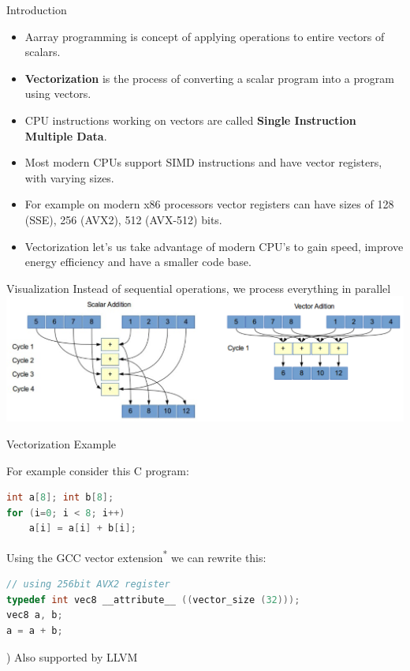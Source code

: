 \documentclass[]{beamer}
\begin{document}
\begin{frame}{Introduction}

\begin{itemize}
  \item Aarray programming is concept of applying operations to entire vectors of scalars.
  \item \textbf{Vectorization} is the process of converting a scalar program into a program using vectors.
  \item CPU instructions working on vectors are called \textbf{Single Instruction Multiple Data}.
  \item Most modern CPUs support SIMD instructions and have vector registers, with varying sizes.
  \item For example on modern x86 processors vector registers can have sizes of 128 (SSE), 256 (AVX2), 512 (AVX-512) bits.
  \item Vectorization let's us take advantage of modern CPU's to gain speed, 
        improve energy  efficiency and have a smaller code base.
\end{itemize}

\end{frame}


\begin{frame}{Visualization}
Instead of sequential operations, we process everything in parallel 
\includegraphics[width=\textwidth]{pictures/vectorization}
\end{frame}


\begin{frame}[fragile]{Vectorization Example}

For example consider this C program:
\begin{lstlisting}[language=C]
int a[8]; int b[8];
for (i=0; i < 8; i++)
    a[i] = a[i] + b[i];
\end{lstlisting}

Using the GCC vector extension\textsuperscript{*} we can rewrite this:
\begin{lstlisting}[language=C]
// using 256bit AVX2 register
typedef int vec8 __attribute__ ((vector_size (32)));
vec8 a, b;
a = a + b;
\end{lstlisting}

{\footnotesize *) Also supported by LLVM}
\end{frame}
\end{document}
